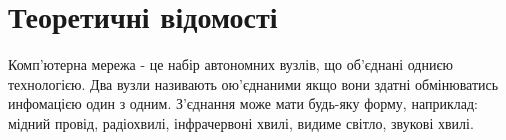 \section{Теоретичні відомості}
Комп'ютерна мережа - це набір автономних вузлів, що об'єднані одниєю технологією.
Два вузли називають ою'єднаними якщо вони здатні обмінюватись инфомацією один з одним.
З'єднання може мати будь-яку форму, наприклад: мідний провід, радіохвилі, інфрачервоні хвилі, видиме світло, звукові хвилі. \cite{nets}
